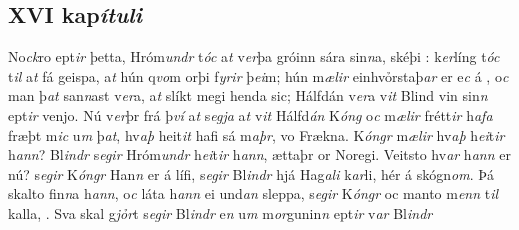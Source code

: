 \subsection*{XVI kap\textit{ítuli}} 
No\textit{ck}ro ept\textit{ir} þetta,  
 Hróm\textit{undr} t\textit{óc} a\textit{t} v\textit{er}þa   gróinn   sára sin\textit{n}a, skéþi  : 
k\textit{er}líng t\textit{óc} t\textit{il} a\textit{t} fá    geispa, 
a\textit{t} hún q\textit{vo}m   orþi f\textit{yrir} þ\textit{ei}m; 
hún m\textit{ælir} einhvỏrstaþ\textit{ar} er e\textit{c}  á  , 
o\textit{c} man þ\textit{at} san\textit{n}ast v\textit{er}a, a\textit{t} slíkt megi henda sic;   Hálfdán   v\textit{er}a   v\textit{it} Blind vin sin\textit{n} ept\textit{ir} venjo. Nú v\textit{er}þr frá þ\textit{ví} a\textit{t} s\textit{egja} a\textit{t}    v\textit{it} Hálfd\textit{án} K\textit{óng} o\textit{c} m\textit{ælir} frétt\textit{ir} h\textit{afa} fræþt m\textit{ic} u\textit{m}
þ\textit{at}, hv\textit{aþ} heit\textit{it} hafi sá 
m\textit{aþr},   vo   Frækna. K\textit{óngr} m\textit{ælir} hv\textit{aþ}
h\textit{ei}t\textit{ir} h\textit{ann}? Bl\textit{indr} s\textit{egir}
Hróm\textit{undr} h\textit{ei}t\textit{ir} h\textit{ann}, 
ættaþr or Noregi. Veitsto hv\textit{ar} h\textit{ann} er nú? s\textit{egir}
K\textit{óngr} Han\textit{n} er   á lífi, s\textit{egir} Bl\textit{indr} hjá Hag\textit{ali}
k\textit{ar}li, hér á skógn\textit{om}. Þá  skalto
fin\textit{n}a h\textit{ann}, o\textit{c} láta h\textit{ann} ei und\textit{an}
sleppa, s\textit{egir} K\textit{óngr} oc  manto m\textit{enn}
t\textit{il} kalla,  . 
Sva skal  g\textit{jỏr}t
 s\textit{egir} Bl\textit{indr} e\textit{n} u\textit{m}
m\textit{or}gunin\textit{n} ept\textit{ir} v\textit{ar} Bl\textit{indr}
